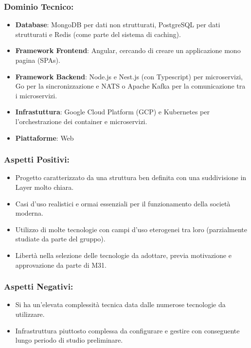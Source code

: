 \documentclass[a4paper,12pt]{article}
\begin{document}
\subsubsection*{Dominio Tecnico:}
\begin{itemize}
    \item \textbf{Database}: MongoDB per dati non strutturati, PostgreSQL per dati strutturati e Redis (come parte del sistema di caching).
    \item \textbf{Framework Frontend}: Angular, cercando di creare un applicazione mono pagina (SPAs).
    \item \textbf{Framework Backend}: Node.js e Nest.js (con Typescript) per microservizi, Go per la sincronizzazione e NATS o Apache Kafka per la comunicazione tra i microservizi.
    \item \textbf{Infrastuttura}: Google Cloud Platform (GCP) e Kubernetes per l'orchestrazione dei container e microservizi.
    \item \textbf{Piattaforme}: Web
\end{itemize}
\subsubsection*{Aspetti Positivi:}
\begin{itemize}
    \item Progetto caratterizzato da una struttura ben definita con una suddivisione in Layer molto chiara.
    \item Casi d’uso realistici e ormai essenziali per il funzionamento della società moderna.
    \item Utilizzo di molte tecnologie con campi d'uso eterogenei tra loro (parzialmente studiate da parte del gruppo).
    \item Libertà nella selezione delle tecnologie da adottare, previa motivazione e approvazione da parte di M31.
\end{itemize}

\subsubsection*{Aspetti Negativi:}
\begin{itemize}
    \item Si ha un'elevata complessità tecnica data dalle numerose tecnologie da utilizzare.
    \item Infrastruttura piuttosto complessa da configurare e gestire con conseguente lungo periodo di studio preliminare.
\end{itemize}
\end{document}
